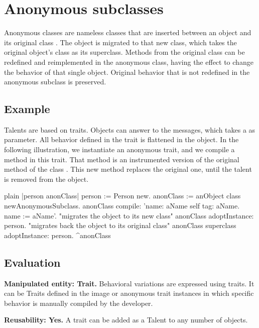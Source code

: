 \documentclass[10pt,twoside,english]{_support/latex/sbabook/sbabook}
\begin{document}
\frontmatter
\pagestyle{plain}

\tableofcontents*
\clearpage\listoffigures

\mainmatter

\chapter{Anonymous subclasses}
Anonymous classes are nameless classes that are inserted between an object and its original class \cite{foote1989reflective,hinkle1993debugging}. The object is migrated to that new class, which takes the original object's class as its superclass. Methods from the original class can be redefined and reimplemented in the anonymous class, having the effect to change the behavior of that single object. Original behavior that is not redefined in the anonymous subclass is preserved.
\section{Example}
Talents are based on traits. Objects can answer to the  messages, which takes a  as parameter. All behavior defined in the trait is flattened in the object. In the following illustration, we instantiate an anonymous trait, and we compile a method in this trait. That method is an instrumented version of the original  method of the class . This new method replaces the original one, until the talent is removed from the object.

\begin{displaycode}{plain}
|person anonClass|
  person := Person new.
	anonClass := anObject class newAnonymousSubclass.
	anonClass
		compile:
			'name: aName
				self tag: aName.
				name := aName'.
  "migrates the object to its new class"
	anonClass adoptInstance: person.
  "migrates back the object to its original class"
  anonClass superclass adoptInstance: person.
	^anonClass
\end{displaycode}
\section{Evaluation}
\textbf{Manipulated entity: Trait.} Behavioral variations are expressed using traits. It can be Traits defined in the image or anonymous trait instances in which specific behavior is manually compiled by the developer.

\textbf{Reusability: Yes.} A trait can be added as a Talent to any number of objects.
\end{document}
